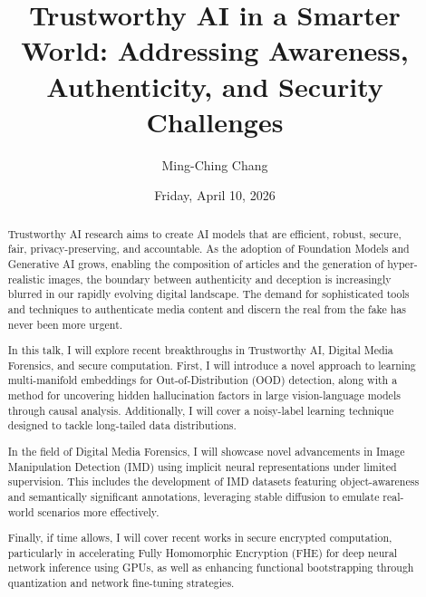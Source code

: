 \documentclass{UAmathtalk}
\author{Ming-Ching Chang}
\title{Trustworthy AI in a Smarter World: Addressing Awareness, Authenticity, and Security Challenges}
\date{Friday, April 10, 2026}
\begin{document}
\maketitle
\renewcommand*{\abstractsize}{\normalsize}
\begin{abstract}
{Trustworthy AI research aims to create AI models that are efficient, robust, secure, fair, privacy-preserving, and accountable. As the adoption of Foundation Models and Generative AI grows, enabling the composition of articles and the generation of hyper-realistic images, the boundary between authenticity and deception is increasingly blurred in our rapidly evolving digital landscape. The demand for sophisticated tools and techniques to authenticate media content and discern the real from the fake has never been more urgent.

In this talk, I will explore recent breakthroughs in Trustworthy AI, Digital Media Forensics, and secure computation. First, I will introduce a novel approach to learning multi-manifold embeddings for Out-of-Distribution (OOD) detection, along with a method for uncovering hidden hallucination factors in large vision-language models through causal analysis. Additionally, I will cover a noisy-label learning technique designed to tackle long-tailed data distributions.

In the field of Digital Media Forensics, I will showcase novel advancements in Image Manipulation Detection (IMD) using implicit neural representations under limited supervision. This includes the development of IMD datasets featuring object-awareness and semantically significant annotations, leveraging stable diffusion to emulate real-world scenarios more effectively.

Finally, if time allows, I will cover recent works in secure encrypted computation, particularly in accelerating Fully Homomorphic Encryption (FHE) for deep neural network inference using GPUs, as well as enhancing functional bootstrapping through quantization and network fine-tuning strategies.}
\end{abstract}
\end{document}
